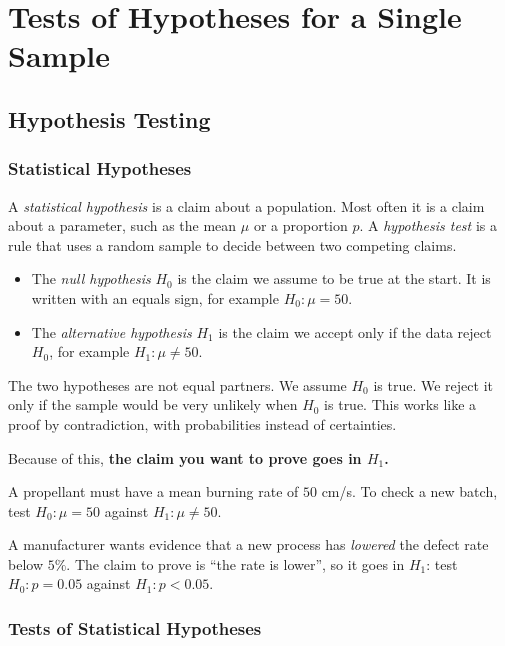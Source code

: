 \chapter{Tests of Hypotheses for a Single Sample}

\section{Hypothesis Testing}

\subsection{Statistical Hypotheses}

A \emph{statistical hypothesis} is a claim about a population. Most often it is a claim about a parameter, such as the mean $\mu$ or a proportion $p$. A \emph{hypothesis test} is a rule that uses a random sample to decide between two competing claims.

\begin{definition}
\begin{itemize}
  \item The \emph{null hypothesis} $H_0$ is the claim we assume to be true at the start. It is written with an equals sign, for example $H_0:\mu=50$.
  \item The \emph{alternative hypothesis} $H_1$ is the claim we accept only if the data reject $H_0$, for example $H_1:\mu\ne50$.
\end{itemize}
\end{definition}

The two hypotheses are not equal partners. We assume $H_0$ is true. We reject it only if the sample would be very unlikely when $H_0$ is true. This works like a proof by contradiction, with probabilities instead of certainties.

Because of this, \textbf{the claim you want to prove goes in $H_1$.}

\begin{example}
A propellant must have a mean burning rate of $50$ cm/s. To check a new batch, test $H_0:\mu=50$ against $H_1:\mu\ne50$.

A manufacturer wants evidence that a new process has \emph{lowered} the defect rate below $5\%$. The claim to prove is ``the rate is lower'', so it goes in $H_1$: test $H_0:p=0.05$ against $H_1:p<0.05$.
\end{example}

\subsection{Tests of Statistical Hypotheses}

